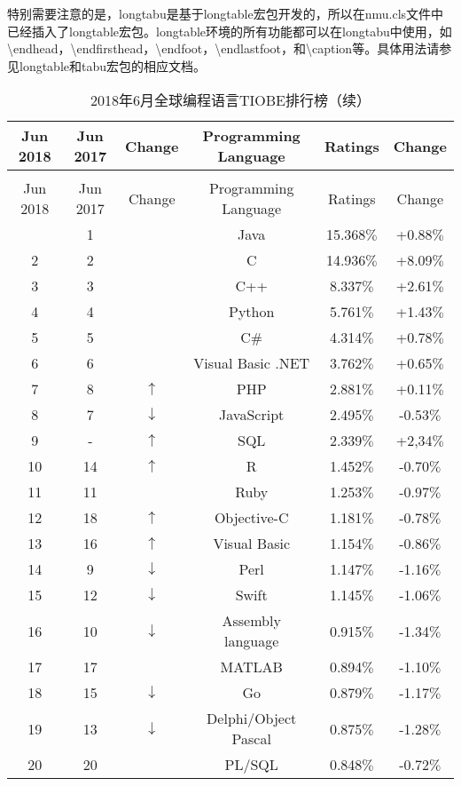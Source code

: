 特别需要注意的是，longtabu是基于longtable宏包开发的，所以在nmu.cls文件中已经插入了longtable宏包。longtable环境的所有功能都可以在longtabu中使用，如\textbackslash endhead，\textbackslash endfirsthead，\textbackslash endfoot，\textbackslash endlastfoot，和\textbackslash caption等。具体用法请参见longtable和tabu宏包的相应文档。
\begin{longtabu}{cccccc}
	\caption{2018年6月全球编程语言TIOBE排行榜}\label{tab:tabu_test_3}\\
	\toprule
	Jun 2018   & Jun 2017 & Change & Programming Language & Ratings &Change\\
	\midrule%
	\endfirsthead
	\caption{2018年6月全球编程语言TIOBE排行榜（续）}\\
	\toprule
	Jun 2018   & Jun 2017 & Change & Programming Language & Ratings &Change \\
	\midrule%
	\endhead
	\bottomrule%
		&	1	&		&	Java	&	15.368$\%$	&	+0.88$\%$	\\
	2	&	2	&		&	C	&	14.936$\%$	&	+8.09$\%$	\\
	3	&	3	&		&	C++	&	8.337$\%$	&	+2.61$\%$	\\
	4	&	4	&		&	Python	&	5.761$\%$	&	+1.43$\%$	\\
	5	&	5	&		&	C$\#$	&	4.314$\%$	&	+0.78$\%$	\\
	6	&	6	&		&	Visual Basic .NET	&	3.762$\%$	&	+0.65$\%$	\\
	7	&	8	&	$\uparrow$	&	PHP	&	2.881$\%$	&	+0.11$\%$	\\
	8	&	7	&	$\downarrow$	&	JavaScript	&	2.495$\%$	&	-0.53$\%$	\\
	9	&	-	&	$\uparrow$	&	SQL	&	2.339$\%$	&	+2,34$\%$	\\
	10	&	14	&	$\uparrow$	&	R	&	1.452$\%$	&	-0.70$\%$	\\
	11	&	11	&		&	Ruby	&	1.253$\%$	&	-0.97$\%$	\\
	12	&	18	&	$\uparrow$	&	Objective-C	&	1.181$\%$	&	-0.78$\%$	\\
	13	&	16	&	$\uparrow$	&	Visual Basic	&	1.154$\%$	&	-0.86$\%$	\\
	14	&	9	&	$\downarrow$	&	Perl	&	1.147$\%$	&	-1.16$\%$	\\
	15	&	12	&	$\downarrow$	&	Swift	&	1.145$\%$	&	-1.06$\%$	\\
	16	&	10	&	$\downarrow$	&	Assembly language	&	0.915$\%$	&	-1.34$\%$	\\
	17	&	17	&		&	MATLAB	&	0.894$\%$	&	-1.10$\%$	\\
	18	&	15	&	$\downarrow$	&	Go	&	0.879$\%$	&	-1.17$\%$	\\
	19	&	13	&	$\downarrow$	&	Delphi/Object Pascal	&	0.875$\%$	&	-1.28$\%$	\\
	20	&	20	&		&	PL/SQL	&	0.848$\%$	&	-0.72$\%$	\\
\end{longtabu}%

